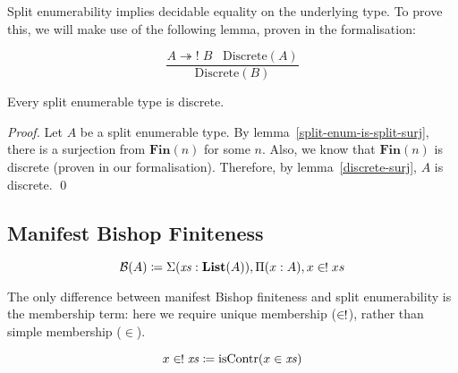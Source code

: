 Split enumerability implies decidable equality on the underlying type.
To prove this, we will make use of the following lemma, proven in the
formalisation:
\begin{romlemma} \label{discrete-surj}
  \begin{equation}
    \frac{
        A \twoheadrightarrow! \; B \; \; \; \text{Discrete}(A)
      }{
       \text{Discrete}(B) 
      }
  \end{equation}
\end{romlemma}
\begin{romlemma} \label{split-enum-discrete}
  Every split enumerable type is discrete.
\end{romlemma}
\begin{proof}
  Let \(A\) be a split enumerable type.
  By lemma~\ref{split-enum-is-split-surj}, there is a surjection from
  \(\mathbf{Fin}(n)\) for some \(n\).
  Also, we know that \(\mathbf{Fin}(n)\) is discrete (proven in our
  formalisation).
  Therefore, by lemma~\ref{discrete-surj}, \(A\) is discrete.
  \qed
\end{proof}
\subsection{Manifest Bishop Finiteness}
\begin{romdefinition}
  \begin{equation} \label{bish-def}
    \mathcal{B}(A) \coloneqq \Sigma {(\mathit{xs} : \textbf{List}(A))} , \Pi {(x : A)} , x \inunique xs
  \end{equation}
\end{romdefinition}
The only difference between manifest Bishop finiteness and split enumerability
is the membership term: here we require unique membership (\(\inunique\)),
rather than simple membership (\(\in\)).
\begin{romdefinition} \label{uniq-memb-def}
  \begin{equation}
    x \inunique \mathit{xs} \coloneqq \text{isContr}(x \in \mathit{xs})
  \end{equation}
\end{romdefinition}

